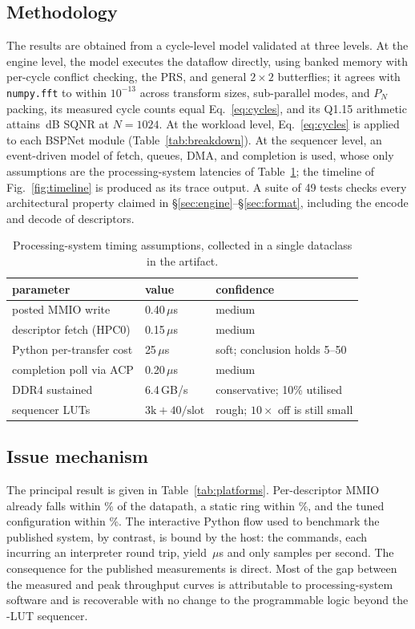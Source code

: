 \documentclass[twocolumn,10pt]{article}
\newcommand{\PN}{P_{N}}
\begin{document}
\subsection{Methodology}
The results are obtained from a cycle-level model validated at three levels.  At
the engine level, the model executes the dataflow directly, using banked memory
with per-cycle conflict checking, the PRS, and general $2{\times}2$ butterflies;
it agrees with \texttt{numpy.fft} to within $10^{-13}$ across transform sizes,
sub-parallel modes, and $\PN$ packing, its measured cycle counts equal
Eq.~\ref{eq:cycles}, and its Q1.15 arithmetic attains \SqnrDb\,dB SQNR at
$N{=}1024$.  At the workload level, Eq.~\ref{eq:cycles} is applied to each
BSPNet module (Table~\ref{tab:breakdown}).  At the sequencer level, an
event-driven model of fetch, queues, DMA, and completion is used, whose only
assumptions are the processing-system latencies of Table~\ref{tab:assume}; the
timeline of Fig.~\ref{fig:timeline} is produced as its trace output.  A suite of
49 tests checks every architectural property claimed in
\S\ref{sec:engine}--\S\ref{sec:format}, including the encode and decode of
descriptors.

\begin{table}[t]
\centering\small
\caption{Processing-system timing assumptions, collected in a single dataclass
in the artifact.}
\label{tab:assume}
\setlength{\tabcolsep}{4pt}
\begin{tabular}{@{}lll@{}}
\toprule
parameter & value & confidence \\
\midrule
posted MMIO write & 0.40\,$\mu$s & medium \\
descriptor fetch (HPC0) & 0.15\,$\mu$s & medium \\
Python per-transfer cost & 25\,$\mu$s & soft; conclusion holds 5--50 \\
completion poll via ACP & 0.20\,$\mu$s & medium \\
DDR4 sustained & 6.4\,GB/s & conservative; 10\% utilised \\
sequencer LUTs & $3\text{k}+40/\text{slot}$ & rough; $10\times$ off is still small \\
\bottomrule
\end{tabular}
\end{table}

\subsection{Issue mechanism}
The principal result is given in Table~\ref{tab:platforms}.  Per-descriptor MMIO
already falls within \MmioOvh\% of the datapath, a static ring within
\StaticOvh\%, and the tuned configuration within \TunedOvh\%.  The interactive
Python flow used to benchmark the published system, by contrast, is bound by the
host: the \ProgCmds{} commands, each incurring an interpreter round trip, yield
\PynqUs\,$\mu$s and only \PynqSps{} samples per second.  The consequence for the
published measurements is direct.  Most of the gap between the measured and peak
throughput curves is attributable to processing-system software and is
recoverable with no change to the programmable logic beyond the \SeqLut-LUT
sequencer.
\end{document}
